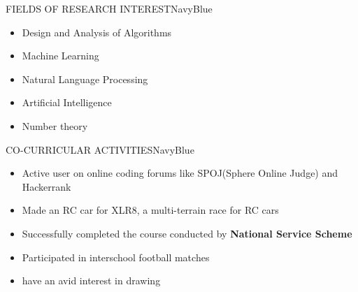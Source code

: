 \documentclass[11pt]{book} %
\begin{document}
\begin{ressection}{FIELDS OF RESEARCH INTEREST}{NavyBlue}

\begin{itemize}
\itemsep-0.1em
\item Design and Analysis of Algorithms
\item Machine Learning
\item Natural Language Processing
\item Artificial Intelligence
\item Number theory
\end{itemize}
  
\end{ressection}

\begin{ressection}{CO-CURRICULAR ACTIVITIES}{NavyBlue}

\begin{itemize}
\itemsep-0.1em
\item Active user on online coding forums like SPOJ(Sphere Online Judge) and Hackerrank
\item Made an RC car for XLR8, a multi-terrain race for RC cars
\item Successfully completed the course conducted by \textbf{National Service Scheme}
\item Participated in interschool football matches
\item have an avid interest in drawing
\end{itemize}
  
\end{ressection}
\end{document}
